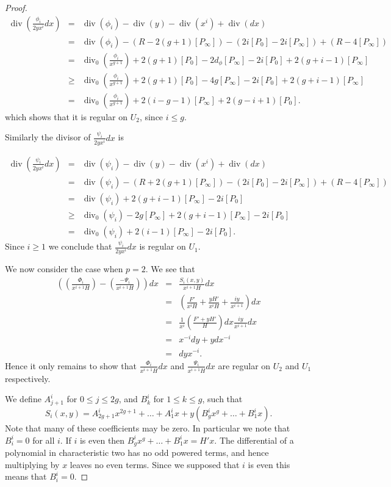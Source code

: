 \documentclass[draft, 11pt]{article} %
\theoremstyle{plain}
\theoremstyle{remark}
\DeclareMathOperator{\di}{div}
\begin{document}
{\begin{proof}
\begin{eqnarray*}
\di\left( \frac{\phi_i}{2yx^i}dx \right) & = & \di(\phi_i) -\di(y) - \di(x^i) + \di (dx) \\
& = & \di(\phi_i) - ( R - 2(g+1)[P_\infty]) - (2i[P_0] - 2i[P_\infty]) + (R - 4[P_\infty]) \\
& = & \di_0\left( \frac{\phi_i}{x^{g+1}}\right) + 2(g+1)[P_0] - 2d_\phi[P_\infty] - 2i[P_0] + 2(g+i-1)[P_\infty] \\
& \geq & \di_0\left( \frac{\phi_i}{x^{g+1}}\right) + 2(g+1)[P_0] - 4g[P_\infty] - 2i[P_0] + 2(g+i-1)[P_\infty] \\
& = & \di_0\left( \frac{\phi_i}{x^{g+1}} \right) + 2(i-g-1)[P_\infty] + 2(g-i+1)[P_0].
\end{eqnarray*}
which shows that it is regular on $U_2$, since $i \leq g$.

Similarly the divisor of $\frac{\psi_i}{2yx^i}dx$ is

\begin{eqnarray*}
\di \left( \frac{\psi_i}{2yx^i}dx\right) & = & \di(\psi_i) - \di(y) - \di(x^i) + \di (dx) \\
& = & \di (\psi_i ) -(R + 2(g+1)[P_\infty]) - (2i[P_0] - 2i[P_\infty]) + (R -4[P_\infty]) \\
& = & \di(\psi_i) + 2(g+i-1)[P_\infty] -2i[P_0] \\
& \geq & \di_0(\psi_i) - 2g[P_\infty] + 2(g+i-1)[P_\infty] -2i[P_0] \\
& = & \di_0(\psi_i) + 2(i-1)[P_\infty] - 2i[P_0].
\end{eqnarray*}
Since $i\geq 1$ we conclude that $\frac{\psi_i}{2yx^i}dx$ is regular on $U_1$.


We now consider the case when $p=2$.
We see that
\begin{eqnarray*}
\left( \left( \frac{\Phi_i}{x^{i+1}H} \right) - \left( \frac{- \Psi_i}{x^{i+1}H} \right) \right) dx & = & \frac{S_i(x,y)}{x^{i+1}H}dx \\
& = & \left( \frac{F'}{x^iH} + \frac{yH'}{x^iH} + \frac{iy}{x^{i+1}} \right) dx \\
& = & \frac{1}{x^i}\left( \frac{F' + yH'}{H} \right) dx \frac{iy}{x^{i+1}}dx \\
& = & x^{-i}dy + ydx^{-i} \\
& = & dyx^{-i}.
\end{eqnarray*}
Hence it only remains to show that $\frac{\Phi_i}{x^{i+1}H}dx$ and $\frac{\Psi_i}{x^{i+1}H}dx$ are regular on $U_2$ and $U_1$ respectively.


We define $A^i_{j+1}$ for $0 \leq j \leq 2g$, and $B_k^i$ for $1\leq k \leq g$, such that
\[
S_i(x,y) = A_{2g+1}^ix^{2g+1} + \ldots + A^i_1 x + y(B_g^i x^g + \ldots + B_1^i x).
\]
Note that many of these coefficients may be zero.
In particular we note that $B_i^i = 0$ for all $i$.
If $i$ is even then $B_g^ix^g + \ldots + B_1^ix = H'x$.
The differential of a polynomial in characteristic two has no odd powered terms, and hence multiplying by $x$ leaves no even terms.
Since we supposed that $i$ is even this means that $B_i^i = 0$.


\end{proof}}
\end{document}
